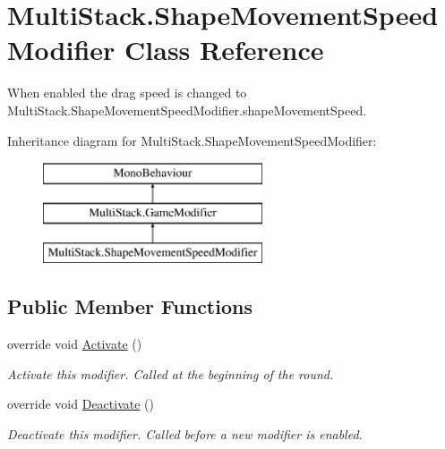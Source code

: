 \hypertarget{class_multi_stack_1_1_shape_movement_speed_modifier}{}\section{Multi\+Stack.\+Shape\+Movement\+Speed\+Modifier Class Reference}
\label{class_multi_stack_1_1_shape_movement_speed_modifier}


When enabled the drag speed is changed to Multi\+Stack.\+Shape\+Movement\+Speed\+Modifier.\+shape\+Movement\+Speed.  


Inheritance diagram for Multi\+Stack.\+Shape\+Movement\+Speed\+Modifier\+:\begin{figure}[H]
\begin{center}
\leavevmode
\includegraphics[height=3.000000cm]{class_multi_stack_1_1_shape_movement_speed_modifier}
\end{center}
\end{figure}
\subsection*{Public Member Functions}
\begin{DoxyCompactItemize}
\item 
override void \hyperlink{class_multi_stack_1_1_shape_movement_speed_modifier_a9c340894f491f8b11b8753bb4f333d4c}{Activate} ()
\begin{DoxyCompactList}\small\item\em Activate this modifier. Called at the beginning of the round. \end{DoxyCompactList}\item 
override void \hyperlink{class_multi_stack_1_1_shape_movement_speed_modifier_a6c8209e8db355d3b3204167c76049503}{Deactivate} ()
\begin{DoxyCompactList}\small\item\em Deactivate this modifier. Called before a new modifier is enabled. \end{DoxyCompactList}\end{DoxyCompactItemize}
